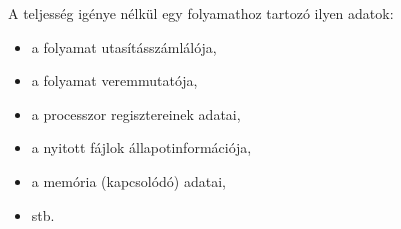 \documentclass[tikz,12pt,margin=0px]{article}
\begin{document}
    \noindent A teljesség igénye nélkül egy folyamathoz tartozó ilyen adatok:
    \begin{itemize}[topsep=8pt,itemsep=4pt,partopsep=4pt, parsep=4pt]
        \item a folyamat utasításszámlálója,
        \item a folyamat veremmutatója,
        \item a processzor regisztereinek adatai,
        \item a nyitott fájlok állapotinformációja,
        \item a memória (kapcsolódó) adatai,
        \item stb.
    \end{itemize}

\end{document}
